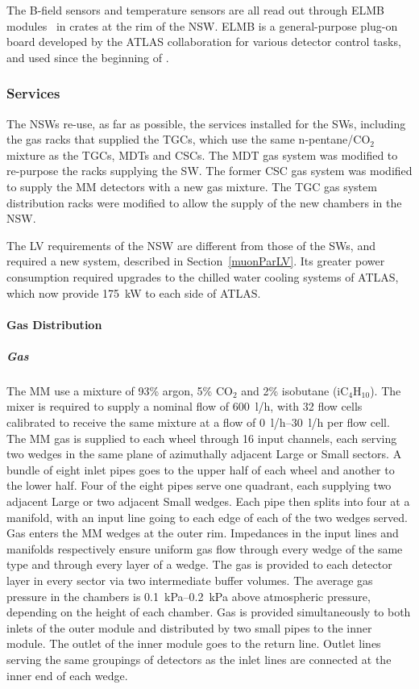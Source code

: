 \documentclass[cernpreprint, atlasdraft=false, UKenglish,british,orcidlogo, texmf, orcidlogo]{atlasdoc}
\begin{document}
The B-field sensors and temperature sensors are all read out through \gls{ELMB} modules~\cite{ELMB} in crates at the rim of the \gls{NSW}. \gls{ELMB} is a general-purpose plug-on board developed by the ATLAS collaboration for various detector control tasks, and used since the beginning of \RunOne.
 
\subsubsection{Services\label{muonSS:services}} 
The \glspl{NSW} re-use, as far as possible, the services installed for the \glspl{SW}, including the gas racks that supplied the \glspl{TGC}, which use the same n-pentane/CO$_2$ mixture as the \glspl{TGC}, \glspl{MDT} 
and \glspl{CSC}.
The \gls{MDT} gas system was modified to re-purpose the racks supplying the \gls{SW}. 
The former \gls{CSC} gas system was modified to supply the \gls{MM} detectors with a new gas mixture.
The \gls{TGC} gas system distribution racks were modified to allow the supply of the new chambers in the \gls{NSW}.
 
The \gls{LV} requirements of the \gls{NSW} are different from those of the \glspl{SW}, and required a new system, described in Section~\ref{muonParLV}.
Its greater power consumption required upgrades to the chilled water cooling systems of ATLAS, which now provide \SI{175}{\kilo\watt} to each side of ATLAS.
 
\paragraph{Gas Distribution}
\subparagraph{ Gas}
The \gls{MM} use a mixture of 93\% argon, 5\% CO$_2$ and 2\% isobutane (iC$_4$H$_{10}$). The mixer is required to supply a nominal flow of \SI{600}{\litre/\hour}, with \num{32} flow cells calibrated to receive the same mixture at a flow of \SIrange{0}{30}{\litre/\hour} per flow cell.
The \gls{MM} gas is supplied to each wheel through \num{16} input channels, each serving two wedges in the same plane of azimuthally adjacent Large or Small sectors.
A bundle of eight inlet pipes goes to the upper half of each wheel and another to the lower half.
Four of the eight pipes serve one quadrant,
each supplying two adjacent Large or two adjacent Small wedges.
Each pipe then splits into four at a manifold, with an input line going to each edge of each of the two wedges served.
Gas enters the \gls{MM} wedges at the outer rim.
Impedances in the input lines and manifolds respectively ensure uniform gas flow through every wedge of the same type and through every layer of a wedge.
The gas is provided to each detector layer in every sector via two intermediate buffer volumes.
The average gas pressure in the chambers is \SIrange{0.1}{0.2}{\kPa} 
above atmospheric pressure, depending on the height of each chamber.
Gas is provided simultaneously to both inlets of the outer module and distributed by two small pipes to the inner module. The outlet of the inner module goes to the return line.
Outlet lines serving the same groupings of detectors as the inlet lines are connected at the inner end of each wedge.
 
\end{document}
